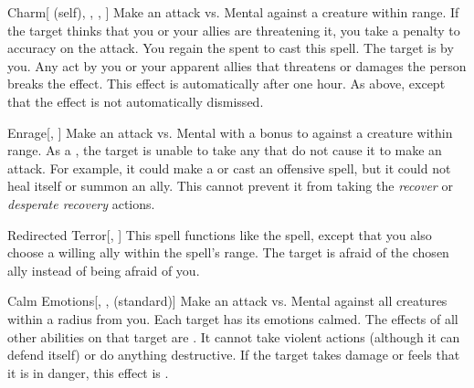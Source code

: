 \lowercase{\hypertarget{spell:Charm}{}}\label{spell:Charm}
\begin{attuneability}[\nth{2}]{\hypertarget{spell:Charm}{Charm}}[ (self), , , ]
Make an attack vs. Mental against a creature within \rnglong range.
If the target thinks that you or your allies are threatening it, you take a  penalty to accuracy on the attack.
\miss You regain the  spent to cast this spell.
\hit The target is \charmed by you.
Any act by you or your apparent allies that threatens or damages the  person breaks the effect.
This effect is automatically  after one hour.
\crit As above, except that the effect is not automatically dismissed.
\end{attuneability}
\vspace{0.25em}



\lowercase{\hypertarget{spell:Enrage}{}}\label{spell:Enrage}
\begin{apability}[\nth{2}]{\hypertarget{spell:Enrage}{Enrage}}[, ]
Make an attack vs. Mental with a  bonus to  against a creature within \rngmed range.
\hit As a , the target is unable to take any  that do not cause it to make an attack.
For example, it could make a  or cast an offensive spell, but it could not heal itself or summon an ally.
This cannot prevent it from taking the \textit{recover} or \textit{desperate recovery} actions.
\end{apability}
\vspace{0.25em}



\lowercase{\hypertarget{spell:Redirected Terror}{}}\label{spell:Redirected Terror}
\begin{apability}[\nth{2}]{\hypertarget{spell:Redirected Terror}{Redirected Terror}}[, ]
This spell functions like the  spell, except that you also choose a willing ally within the spell's range.
The target is afraid of the chosen ally instead of being afraid of you.
\end{apability}
\vspace{0.25em}



\lowercase{\hypertarget{spell:Calm Emotions}{}}\label{spell:Calm Emotions}
\begin{apability}[\nth{3}]{\hypertarget{spell:Calm Emotions}{Calm Emotions}}[, ,  (standard)]
Make an attack vs. Mental against all creatures within a \arealarge radius from you.
\hit Each target has its emotions calmed.
The effects of all other  abilities on that target are .
It cannot take violent actions (although it can defend itself) or do anything destructive.
If the target takes damage or feels that it is in danger, this effect is .
\end{apability}
\vspace{0.25em}



